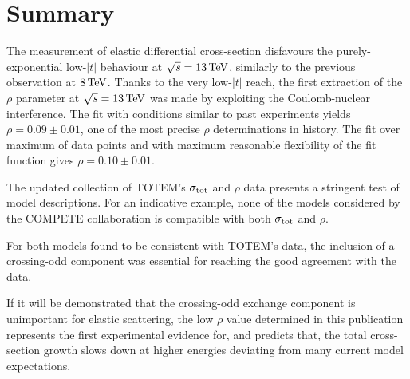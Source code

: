 \section{Summary}
\label{sec:summary}

The measurement of elastic differential cross-section disfavours the purely-exponential low-$|t|$ behaviour at $\sqrt s = 13\,{\rm TeV}$, similarly to the previous observation at $8\,{\rm TeV}$. Thanks to the very low-$|t|$ reach, the first extraction of the $\rho$ parameter at $\sqrt s = 13\,{\rm TeV}$ was made by exploiting the Coulomb-nuclear interference. The fit with conditions similar to past experiments yields $\rho = 0.09 \pm 0.01$, one of the most precise $\rho$ determinations in history. The fit over maximum of data points and with maximum reasonable flexibility of the fit function gives $\rho = 0.10 \pm 0.01$.

The updated collection of TOTEM's $\sigma_{\rm tot}$ and $\rho$ data presents a stringent test of model descriptions. For an indicative example, none of the models considered by the COMPETE collaboration is compatible with both $\sigma_{\rm tot}$ and $\rho$.

For both models found to be consistent with TOTEM's data, the inclusion of a crossing-odd component was essential for reaching the good agreement with the data.

If it will be demonstrated that the crossing-odd exchange component is unimportant for elastic scattering, the low $\rho$ value determined in this publication represents the first experimental evidence for, and predicts that, the total cross-section growth slows down at higher energies deviating from many current model expectations.
